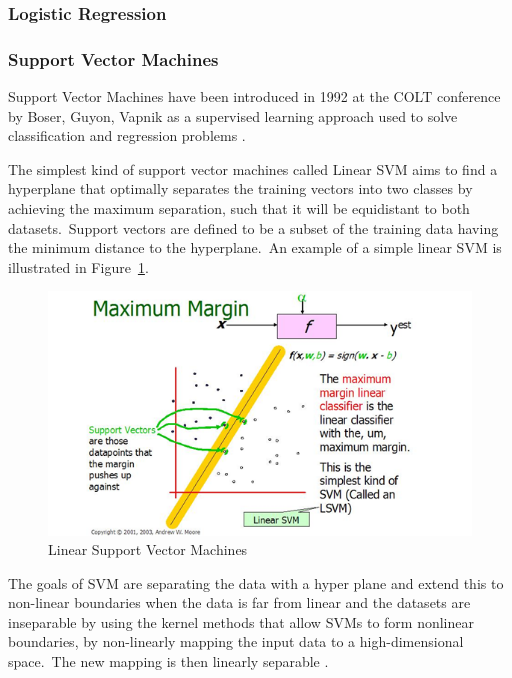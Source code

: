 	\subsubsection{Logistic Regression}	
	
	\subsubsection{Support Vector Machines}
		\label{svmSection}

			Support Vector Machines have been introduced in 1992 at the COLT conference by Boser, Guyon, Vapnik as a supervised learning approach used to solve classification and regression problems \cite{a:colt92}.

			The simplest kind of support vector machines called Linear SVM aims to find a hyperplane that optimally separates the training vectors into two classes by achieving the maximum separation, such that it will be equidistant to both datasets.\ Support vectors are defined to be a subset of the training data having the minimum distance to the hyperplane.\ An example of a simple linear SVM is illustrated in Figure~\ref{svm}.
				
				\begin{figure}[h!]
					\centering
					\includegraphics[scale=0.7]{graphics/LSVM.PNG} 
					\caption{Linear Support Vector Machines \cite{a:SvmSlides}} \label{svm} 
				\end{figure}

			The goals of SVM are separating the data with a hyper plane and extend this to non-linear boundaries when the data is far from linear and the datasets are inseparable by using the kernel methods that allow SVMs to form nonlinear boundaries, by non-linearly mapping the input data to a high-dimensional space.\ The new mapping is then linearly separable \cite{a:Nello:Svm} \cite{a:Tom:MachineLearning}.

